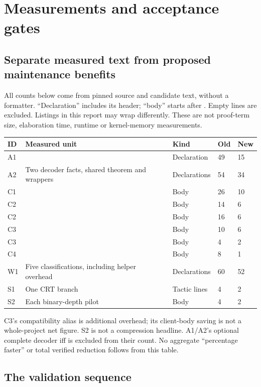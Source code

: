 \section{Measurements and acceptance gates}
\label{sec:validation}

\subsection{Separate measured text from proposed maintenance benefits}

All counts below come from pinned source and candidate text, without a
formatter. ``Declaration'' includes its header; ``body'' starts after
. Empty lines are excluded. Listings in this report may wrap
differently. These are not proof-term size, elaboration time, runtime or
kernel-memory measurements.

\begin{tabularx}{\linewidth}{@{}L{0.38in}Y L{0.88in}R{0.40in}R{0.40in}@{}}
\toprule
ID & Measured unit & Kind & Old & New\\
\midrule
A1 &  & Declaration & 49 & 15\\
A2 & Two decoder facts, shared theorem and wrappers & Declarations & 54 & 34\\
C1 &  & Body & 26 & 10\\
C2 &  & Body & 14 & 6\\
C2 &  & Body & 16 & 6\\
C3 &  & Body & 10 & 6\\
C3 &  & Body & 4 & 2\\
C4 &  & Body & 8 & 1\\
W1 & Five classifications, including helper overhead & Declarations & 60 & 52\\
S1 & One CRT branch & Tactic lines & 4 & 2\\
S2 & Each binary-depth pilot & Body & 4 & 2\\
\bottomrule
\end{tabularx}

C3's compatibility alias is additional overhead; its client-body saving is
not a whole-project net figure. S2 is not a compression headline. A1/A2's
optional complete decoder iff is excluded from their count. No aggregate
``percentage faster'' or total verified reduction follows from this table.

\subsection{The validation sequence}

